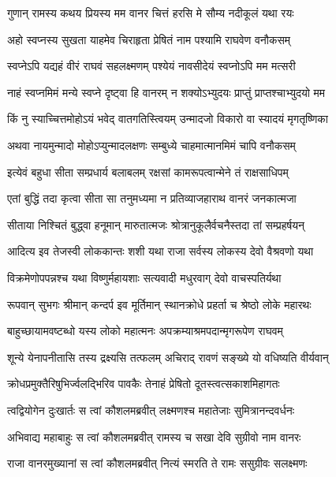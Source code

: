 \twolineshloka
{गुणान् रामस्य कथय प्रियस्य मम वानर}
{चित्तं हरसि मे सौम्य नदीकूलं यथा रयः} %

\twolineshloka
{अहो स्वप्नस्य सुखता याहमेव चिराहृता}
{प्रेषितं नाम पश्यामि राघवेण वनौकसम्} %

\twolineshloka
{स्वप्नेऽपि यद्यहं वीरं राघवं सहलक्ष्मणम्}
{पश्येयं नावसीदेयं स्वप्नोऽपि मम मत्सरी} %

\twolineshloka
{नाहं स्वप्नमिमं मन्ये स्वप्ने दृष्ट्वा हि वानरम्}
{न शक्योऽभ्युदयः प्राप्तुं प्राप्तश्चाभ्युदयो मम} %

\twolineshloka
{किं नु स्याच्चित्तमोहोऽयं भवेद् वातगतिस्त्वियम्}
{उन्मादजो विकारो वा स्यादयं मृगतृष्णिका} %

\twolineshloka
{अथवा नायमुन्मादो मोहोऽप्युन्मादलक्षणः}
{सम्बुध्ये चाहमात्मानमिमं चापि वनौकसम्} %

\twolineshloka
{इत्येवं बहुधा सीता सम्प्रधार्य बलाबलम्}
{रक्षसां कामरूपत्वान्मेने तं राक्षसाधिपम्} %

\twolineshloka
{एतां बुद्धिं तदा कृत्वा सीता सा तनुमध्यमा}
{न प्रतिव्याजहाराथ वानरं जनकात्मजा} %

\twolineshloka
{सीताया निश्चितं बुद्ध्वा हनूमान् मारुतात्मजः}
{श्रोत्रानुकूलैर्वचनैस्तदा तां सम्प्रहर्षयन्} %

\twolineshloka
{आदित्य इव तेजस्वी लोककान्तः शशी यथा}
{राजा सर्वस्य लोकस्य देवो वैश्रवणो यथा} %

\twolineshloka
{विक्रमेणोपपन्नश्च यथा विष्णुर्महायशाः}
{सत्यवादी मधुरवाग् देवो वाचस्पतिर्यथा} %

\twolineshloka
{रूपवान् सुभगः श्रीमान् कन्दर्प इव मूर्तिमान्}
{स्थानक्रोधे प्रहर्ता च श्रेष्ठो लोके महारथः} %

\twolineshloka
{बाहुच्छायामवष्टब्धो यस्य लोको महात्मनः}
{अपक्रम्याश्रमपदान्मृगरूपेण राघवम्} %

\twolineshloka
{शून्ये येनापनीतासि तस्य द्रक्ष्यसि तत्फलम्}
{अचिराद् रावणं सङ्ख्ये यो वधिष्यति वीर्यवान्} %

\twolineshloka
{क्रोधप्रमुक्तैरिषुभिर्ज्वलद्भिरिव पावकैः}
{तेनाहं प्रेषितो दूतस्त्वत्सकाशमिहागतः} %

\twolineshloka
{त्वद्वियोगेन दुःखार्तः स त्वां कौशलमब्रवीत्}
{लक्ष्मणश्च महातेजाः सुमित्रानन्दवर्धनः} %

\twolineshloka
{अभिवाद्य महाबाहुः स त्वां कौशलमब्रवीत्}
{रामस्य च सखा देवि सुग्रीवो नाम वानरः} %

\twolineshloka
{राजा वानरमुख्यानां स त्वां कौशलमब्रवीत्}
{नित्यं स्मरति ते रामः ससुग्रीवः सलक्ष्मणः} %

